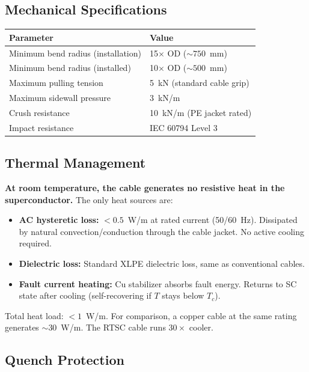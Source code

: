 \documentclass[11pt, a4paper]{article}
\begin{document}
\subsection{Mechanical Specifications}

\begin{center}
\begin{tabular}{@{}ll@{}}
\toprule
\textbf{Parameter} & \textbf{Value} \\
\midrule
Minimum bend radius (installation) & 15$\times$ OD ($\sim 750$~mm) \\
Minimum bend radius (installed) & 10$\times$ OD ($\sim 500$~mm) \\
Maximum pulling tension & 5~kN (standard cable grip) \\
Maximum sidewall pressure & 3~kN/m \\
Crush resistance & 10~kN/m (PE jacket rated) \\
Impact resistance & IEC 60794 Level 3 \\
\bottomrule
\end{tabular}
\end{center}

\subsection{Thermal Management}

\textbf{At room temperature, the cable generates no resistive heat
in the superconductor.} The only heat sources are:

\begin{itemize}[nosep]
  \item \textbf{AC hysteretic loss:} $< 0.5$~W/m at rated current
        (50/60~Hz). Dissipated by natural convection/conduction
        through the cable jacket. No active cooling required.
  \item \textbf{Dielectric loss:} Standard XLPE dielectric loss,
        same as conventional cables.
  \item \textbf{Fault current heating:} Cu stabilizer absorbs fault
        energy. Returns to SC state after cooling (self-recovering
        if $T$ stays below $T_c$).
\end{itemize}

Total heat load: $< 1$~W/m. For comparison, a copper cable at the
same rating generates $\sim 30$~W/m. The RTSC cable runs $30\times$
cooler.

\subsection{Quench Protection}
\end{document}
